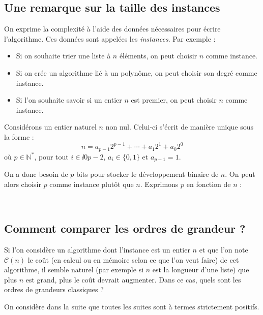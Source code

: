 \documentclass[french,11pt,twoside]{VcCours}
\begin{document}
\subsection{Une remarque sur la taille des instances}
On exprime la complexité à l'aide des données nécessaires pour écrire l'algorithme. Ces données sont appelées les \emph{instances}. Par exemple :

\begin{itemize}
\item Si on souhaite trier une liste à $n$ éléments, on peut choisir $n$ comme instance.
\item Si on crée un algorithme lié à un polynôme, on peut choisir son degré comme instance. 
\item Si l'on souhaite savoir si un entier $n$ est premier, on peut choisir $n$ comme instance.
\end{itemize}

\medskip

\begin{Remarque}[\alerte]{}

    Considérons un entier naturel $n$ non nul. Celui-ci s'écrit de manière unique sous la forme :
$$ n = a_{p-1}2^{p-1} + \cdots + a_1 2^1 + a_0 2^0$$
où $p \in \mathbb{N}^*$, pour tout $i \in \ii{0}{p-2}$, $a_i \in \lbrace 0,1 \rbrace$ et $a_{p-1}=1$.

\medskip

On a donc besoin de $p$ bits pour stocker le développement binaire de $n$. 
On peut alors choisir $p$ comme instance plutôt que $n$. 
Exprimons $p$ en fonction de $n$ :

\vspace*{4cm}~

\end{Remarque}

\subsection{Comment comparer les ordres de grandeur ?}

Si l'on considère un algorithme dont l'instance est un entier $n$ et que l'on note $\mathcal{C}(n)$ le coût (en calcul ou en mémoire selon ce que l'on veut faire) de cet algorithme, il semble naturel (par exemple si $n$ est la longueur d'une liste) que plus $n$ est grand, plus le coût devrait augmenter. Dans ce cas, quels sont les ordres de grandeurs classiques ?

\medskip

On considère dans la suite que toutes les suites sont à termes strictement positifs.
\end{document}
